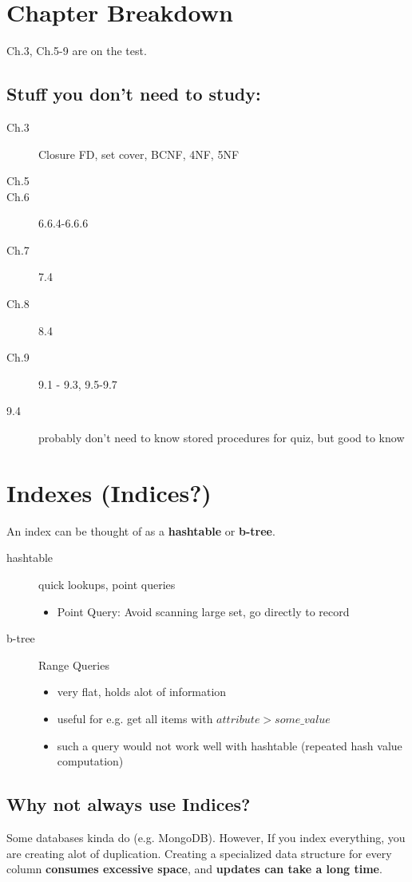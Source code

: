 \documentclass[12pt]{article}
\begin{document}
\section{Chapter Breakdown}
Ch.3, Ch.5-9 are on the test.\\
\subsection{Stuff you don't need to study:}
\begin{description}
  \item[Ch.3] Closure FD, set cover,  BCNF, 4NF, 5NF
  \item[Ch.5]
  \item[Ch.6] 6.6.4-6.6.6
  \item[Ch.7] 7.4
  \item[Ch.8] 8.4
  \item[Ch.9] 9.1 - 9.3, 9.5-9.7
  \item[9.4] probably don't need to know stored procedures for quiz, but good to
    know
\end{description}

\section{Indexes (Indices?)}
An index can be thought of as a \textbf{hashtable} or \textbf{b-tree}.
\begin{description}
  \item[hashtable] {quick lookups, point queries
      \begin{itemize}
        \item {Point Query: Avoid scanning large set, go directly to record}
      \end{itemize}
    }
  \item[b-tree] {Range Queries
      \begin{itemize}
        \item {very flat, holds alot of information}
        \item {useful for e.g. get all items with $attribute > some\_value$}
        \item {such a query would not work well with hashtable (repeated hash
            value computation)}
      \end{itemize}
    }
\end{description}
\subsection{Why not always use Indices?}
Some databases kinda do (e.g. MongoDB). However,
If you index everything, you are creating alot of duplication. Creating a
specialized data structure for every column \textbf{consumes excessive space},
and \textbf{updates can take a long time}.
\end{document}
